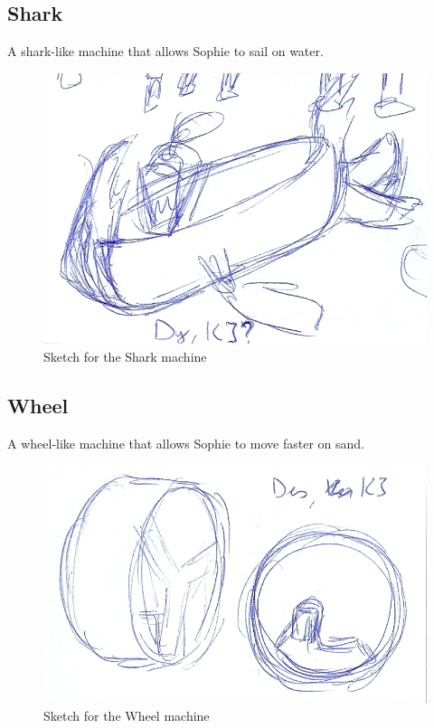 \subsection*{Shark}
A shark-like machine that allows Sophie to sail on water.
\begin{figure}[H]
  \centering
  \includegraphics[width=14cm]{Images/Machines/machineShark}
  \caption{Sketch for the Shark machine}
\end{figure}

\subsection*{Wheel}
A wheel-like machine that allows Sophie to move faster on sand.
\begin{figure}[H]
  \centering
  \includegraphics[width=14cm]{Images/Machines/machineWheel}
  \caption{Sketch for the Wheel machine}
\end{figure}

